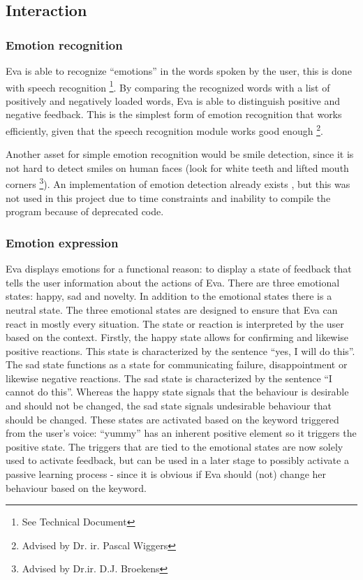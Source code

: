 \documentclass[project_eva.tex]{subfiles}
\begin{document}
\subsection*{Interaction}

\subsubsection*{Emotion recognition}
Eva is able to recognize ``emotions'' in the words spoken by the user, this is done with speech recognition \footnote{See 
Technical Document}. By comparing the recognized words with a list of positively and negatively loaded words, Eva is able to distinguish positive and negative feedback. This is the simplest form of emotion recognition that works efficiently, given that the speech recognition module works good enough \footnote{Advised by Dr. ir. Pascal Wiggers}. 

Another asset for simple emotion recognition would be smile detection, since it is not hard to detect smiles on human faces (look for white teeth and lifted mouth corners \footnote{Advised by Dr.ir. D.J. Broekens }). An implementation of emotion 
detection already exists \cite{autosmiley}, but this was not used in this project due to time 
constraints and inability to compile the program because of deprecated code.
 
\subsubsection*{Emotion expression}
\label{sec:Emotion expression}
Eva displays emotions for a functional reason: to display a state of feedback that tells the user information about the 
actions of Eva. There are three emotional states: happy, sad and novelty. In  addition to the emotional states there is a 
neutral state. The three emotional states are designed to ensure that Eva can react in mostly every situation. The state or 
reaction is interpreted by the user based on the context. Firstly, the happy  state allows for confirming and likewise 
positive reactions. This state is characterized by the sentence ``yes, I will do this''. The sad state functions as a state 
for communicating failure, disappointment or likewise negative reactions. The sad state is characterized by the sentence 
``I cannot do this''.  Whereas the happy state signals that the behaviour is desirable and should not be changed, the sad 
state signals undesirable behaviour that should be changed. These states are activated based on the keyword triggered from 
the user’s voice: ``yummy'' has an inherent positive element so it triggers the positive state. The triggers that are tied 
to the emotional states are now solely used to activate feedback, but can be used in a later stage to possibly activate a 
passive learning process - since it is obvious if Eva should (not) change her behaviour based on the keyword.
\end{document}
